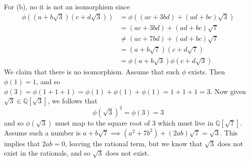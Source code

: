 \begin{solution}
    For (b), no it is not an isomorphism since 
    \begin{align}
      \phi ((a + b \sqrt{3}) (c + d \sqrt{3})) & = \phi ((ac + 3bd) + (ad + bc) \sqrt{3}) \\
                                               & = (ac + 3bd) + (ad + bc) \sqrt{7} \\
                                               & \neq (ac + 7bd) + (ad + bc) \sqrt{7} \\ 
                                               & = (a + b \sqrt{7}) (c + d \sqrt{7}) \\
                                               & = \phi(a + b \sqrt{3}) \phi(c + d  \sqrt{3}) 
    \end{align} 
    We claim that there is no isomorphism. Assume that such $\phi$ exists. Then $\phi(1) = 1$, and so $\phi(3) = \phi(1 + 1 + 1) = \phi(1) + \phi(1) + \phi(1) = 1 + 1 + 1 = 3$. Now given $\sqrt{3} \in \mathbb{Q}[\sqrt{3}]$, we follows that 
    \begin{equation}
      \phi(\sqrt{3})^2 = \phi(3) = 3
    \end{equation}
    and so $\phi(\sqrt{3})$ must map to the square root of $3$ which must live in $\mathbb{Q}[\sqrt{7}]$. Assume such a number is $a + b \sqrt{7} \implies (a^2 + 7b^2) + (2ab) \sqrt{7} = \sqrt{3}$. This implies that $2ab = 0$, leaving the rational term, but we know that $\sqrt{3}$ does not exist in the rationals, and so $\sqrt{3}$ does not exist.  
  \end{solution}


